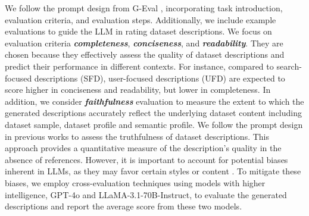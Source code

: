 We follow the prompt design from G-Eval \cite{liu2023geval}, incorporating task introduction, evaluation criteria, and evaluation steps. Additionally, we include example evaluations to guide the LLM in rating dataset descriptions. 
% 
We focus on evaluation criteria \textit{\textbf{completeness}}, \textit{\textbf{conciseness}}, and \textit{\textbf{readability}}. They are chosen because they effectively assess the quality of dataset descriptions and predict their performance in different contexts. For instance, compared to search-focused descriptions (SFD), user-focused descriptions (UFD) are expected to score higher in conciseness and readability, but lower in completeness.
% 
In addition, we consider \textit{\textbf{faithfulness}} evaluation to measure the extent to which the generated descriptions accurately reflect the underlying dataset content including dataset sample, dataset profile and semantic profile. We follow the prompt design in previous works \cite{seo2024unveiling, zhao2023investigating} to assess the truthfulness of dataset descriptions.
% 
% 
% 
% 
This approach provides a quantitative measure of the description’s quality in the absence of references. However, it is important to account for potential biases inherent in LLMs, as they may favor certain styles or content \cite{panickssery2024llm_favor}. To mitigate these biases, we employ cross-evaluation techniques using models with higher intelligence, GPT-4o and LLaMA-3.1-70B-Instruct, to evaluate the generated descriptions and report the average score from these two models.


